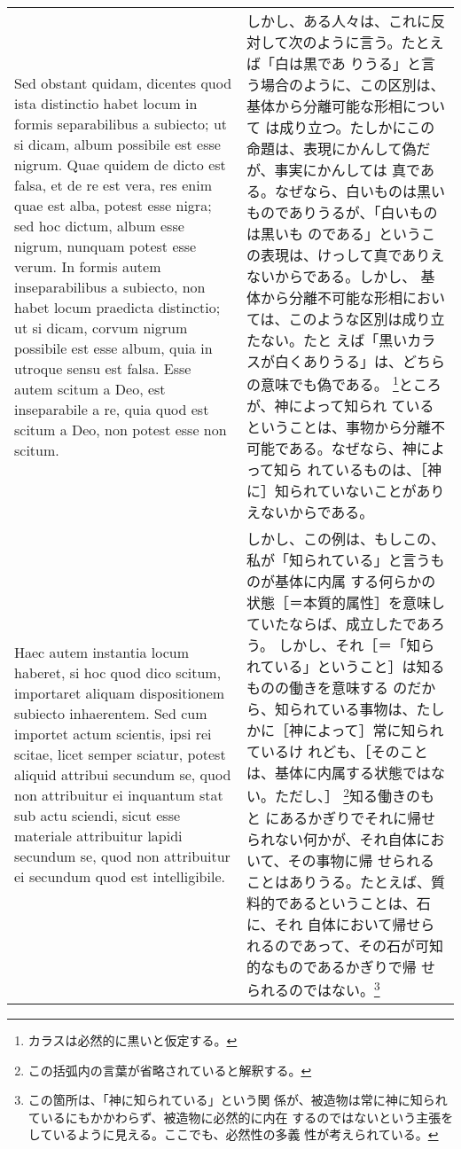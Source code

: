 \documentclass[10pt]{jsarticle} %
\begin{document}
\begin{longtable}{p{21em}p{21em}}
Sed obstant quidam, dicentes quod ista distinctio habet locum in
formis separabilibus a subiecto; ut si dicam, album possibile est esse
nigrum. Quae quidem de dicto est falsa, et de re est vera, res enim
quae est alba, potest esse nigra; sed hoc dictum, album esse nigrum,
nunquam potest esse verum. In formis autem inseparabilibus a subiecto,
non habet locum praedicta distinctio; ut si dicam, corvum nigrum
possibile est esse album, quia in utroque sensu est falsa. Esse autem
scitum a Deo, est inseparabile a re, quia quod est scitum a Deo, non
potest esse non scitum.


&

しかし、ある人々は、これに反対して次のように言う。たとえば「白は黒であ
りうる」と言う場合のように、この区別は、基体から分離可能な形相について
は成り立つ。たしかにこの命題は、表現にかんして偽だが、事実にかんしては
真である。なぜなら、白いものは黒いものでありうるが、「白いものは黒いも
のである」というこの表現は、けっして真でありえないからである。しかし、
基体から分離不可能な形相においては、このような区別は成り立たない。たと
えば「黒いカラスが白くありうる」は、どちらの意味でも偽である。
\footnote{カラスは必然的に黒いと仮定する。}ところが、神によって知られ
ているということは、事物から分離不可能である。なぜなら、神によって知ら
れているものは、［神に］知られていないことがありえないからである。



\\


Haec autem instantia locum haberet, si hoc quod dico scitum,
importaret aliquam dispositionem subiecto inhaerentem. Sed cum
importet actum scientis, ipsi rei scitae, licet semper sciatur, potest
aliquid attribui secundum se, quod non attribuitur ei inquantum stat
sub actu sciendi, sicut esse materiale attribuitur lapidi secundum se,
quod non attribuitur ei secundum quod est intelligibile.


&

しかし、この例は、もしこの、私が「知られている」と言うものが基体に内属
する何らかの状態［＝本質的属性］を意味していたならば、成立したであろう。
しかし、それ［＝「知られている」ということ］は知るものの働きを意味する
のだから、知られている事物は、たしかに［神によって］常に知られているけ
れども、［そのことは、基体に内属する状態ではない。ただし、］
\footnote{この括弧内の言葉が省略されていると解釈する。}知る働きのもと
にあるかぎりでそれに帰せられない何かが、それ自体において、その事物に帰
せられることはありうる。たとえば、質料的であるということは、石に、それ
自体において帰せられるのであって、その石が可知的なものであるかぎりで帰
せられるのではない。\footnote{この箇所は、「神に知られている」という関
係が、被造物は常に神に知られているにもかかわらず、被造物に必然的に内在
するのではないという主張をしているように見える。ここでも、必然性の多義
性が考えられている。}


\\
\end{longtable}
\newpage
\end{document}
